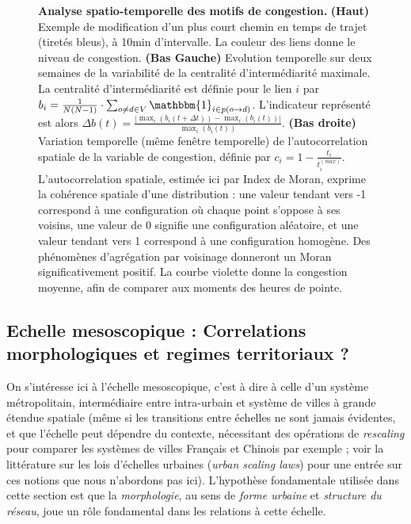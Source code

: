\begin{figure}
\caption{\textbf{Analyse spatio-temporelle des motifs de congestion.} \textbf{(Haut)} Exemple de modification d'un plus court chemin en temps de trajet (tiretés bleus), à 10min d'intervalle. La couleur des liens donne le niveau de congestion. \textbf{(Bas Gauche)} Evolution temporelle sur deux semaines de la variabilité de la centralité d'intermédiarité maximale. La centralité d'intermédiarité est définie pour le lien $i$ par $b_i = \frac{1}{N(N-1)}\cdot \sum_{o\neq d \in V}\mathbbm{1}_{i\in p(o\rightarrow d)}$. L'indicateur représenté est alors $\Delta b(t) = \frac{\left|\max_i (b_i(t + \Delta t)) - \max_i (b_i(t))\right|}{\max_i (b_i(t))}$. \textbf{(Bas droite)} Variation temporelle (même fenêtre temporelle) de l'autocorrelation spatiale de la variable de congestion, définie par $c_i = 1 - \frac{t_i}{t_i^{(max)}}$. L'autocorrelation spatiale, estimée ici par Index de Moran, exprime la cohérence spatiale d'une distribution : une valeur tendant vers -1 correspond à une configuration où chaque point s'oppose à ses voisins, une valeur de 0 signifie une configuration aléatoire, et une valeur tendant vers 1 correspond à une configuration homogène. Des phénomènes d'agrégation par voisinage donneront un Moran significativement positif. La courbe violette donne la congestion moyenne, afin de comparer aux moments des heures de pointe.}
\label{fig:traffic}
\end{figure}






\subsection{Echelle mesoscopique : Correlations morphologiques et regimes territoriaux ?}

On s'intéresse ici à l'échelle mesoscopique, c'est à dire à celle d'un système métropolitain, intermédiaire entre intra-urbain et système de villes à grande étendue spatiale (même si les transitions entre échelles ne sont jamais évidentes, et que l'échelle peut dépendre du contexte, nécessitant des opérations de \emph{rescaling} pour comparer les systèmes de villes Français et Chinois par exemple ; voir la littérature sur les lois d'échelles urbaines (\emph{urban scaling laws}) pour une entrée sur ces notions que nous n'abordons pas ici). L'hypothèse fondamentale utilisée dans cette section est que la \emph{morphologie}, au sens de \emph{forme urbaine} et \emph{structure du réseau}, joue un rôle fondamental dans les relations à cette échelle. 



